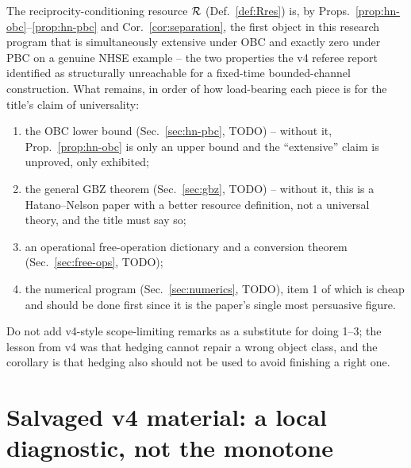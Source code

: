 The reciprocity-conditioning resource $\mathcal R$
(Def.~\ref{def:Rres}) is, by Props.~\ref{prop:hn-obc}--\ref{prop:hn-pbc}
and Cor.~\ref{cor:separation}, the first object in this research
program that is simultaneously extensive under OBC and exactly zero
under PBC on a genuine NHSE example -- the two properties the v4
referee report identified as structurally unreachable for a
fixed-time bounded-channel construction. What remains, in order of
how load-bearing each piece is for the title's claim of
universality:
\begin{enumerate}
\item the OBC lower bound (Sec.~\ref{sec:hn-pbc}, TODO) -- without
  it, Prop.~\ref{prop:hn-obc} is only an upper bound and the
  ``extensive'' claim is unproved, only exhibited;
\item the general GBZ theorem (Sec.~\ref{sec:gbz}, TODO) -- without
  it, this is a Hatano--Nelson paper with a better resource
  definition, not a universal theory, and the title must say so;
\item an operational free-operation dictionary and a conversion
  theorem (Sec.~\ref{sec:free-ops}, TODO);
\item the numerical program (Sec.~\ref{sec:numerics}, TODO), item 1
  of which is cheap and should be done first since it is the
  paper's single most persuasive figure.
\end{enumerate}
Do not add v4-style scope-limiting remarks as a substitute for doing
1--3; the lesson from v4 was that hedging cannot repair a wrong
object class, and the corollary is that hedging also should not be
used to avoid finishing a right one.

\appendix
\section{Salvaged v4 material: a local diagnostic, not the monotone}
\label{app:v4}


